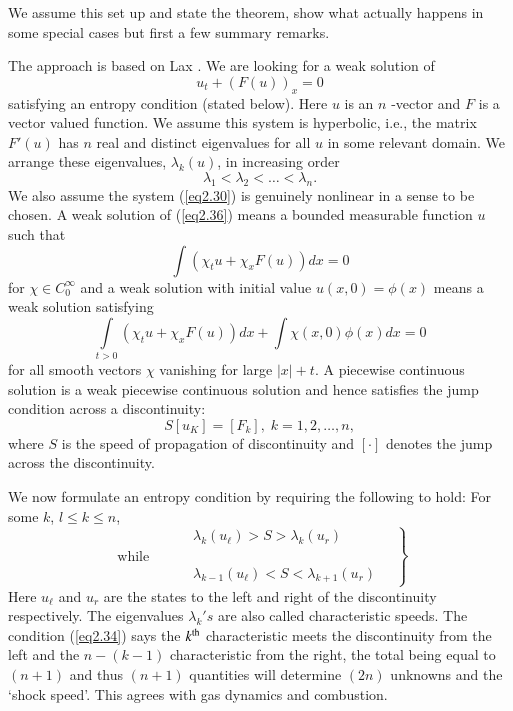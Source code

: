 We assume this set up and state the theorem, show what actually happens in some special cases but first a few summary remarks.

The approach is based on Lax \cite{key23}. We are looking for a weak solution of 
\begin{equation*}
u_t + (F(u))_x = 0 \tag{2.30}\label{eq2.30}
\end{equation*}\pageoriginale
satisfying an entropy condition (stated below). Here $u$ is an $n$ -vector and $F$ is a vector valued function. We assume this system is hyperbolic, i.e., the matrix $F'(u)$ has $n$ real and distinct eigenvalues for all $u$ in some relevant domain. We arrange these eigenvalues, $\lambda_k(u)$, in increasing order
\begin{equation*}
\lambda_1 < \lambda_2 < \ldots < \lambda_n .
\tag{2.31}\label{eq2.31}
\end{equation*}
We also assume the system (\ref{eq2.30}) is genuinely nonlinear in a sense to be chosen. A weak solution of (\ref{eq2.36}) means a bounded measurable function $u$ such that
\begin{equation*}
\int(\chi_t u + \chi_x F(u)) dx = 0\tag{2.32a}\label{eq2.32a}
\end{equation*}
for $\chi \in C^\infty_0$ and a weak solution with initial value $u(x,0) = \phi (x)$ means a weak solution satisfying
\begin{equation*}
\int\limits_{t > 0} (\chi_t u + \chi_x F(u)) dx + \int \chi (x,0) \phi (x) dx = 0
\tag{2.32b}\label{eq2.32b}
\end{equation*}
for all smooth vectors $\chi$ vanishing for large $|x| + t$. A piecewise continuous solution is a weak piecewise continuous solution and hence satisfies the jump condition across a discontinuity:
\begin{equation*}
S[u_K] = [F_k], \; k = 1,2, \ldots ,n,\tag{2.33}\label{eq2.33}
\end{equation*}
where $S$ is the speed of propagation of discontinuity and $[\cdot]$ denotes the jump across the discontinuity.

We now formulate an entropy condition by requiring the following to hold: For some $k$, $l \leq k \leq n$,
\begin{equation*}
\left. 
\begin{aligned}
& \qquad \lambda_k (u_\ell) > S > \lambda_k (u_r) \\
\text{while  }& \\
& \qquad \lambda_{k-1} (u_\ell) < S < \lambda_{k+1} (u_r) \quad 
\end{aligned}
\right\} \tag{2.34}\label{eq2.34}
\end{equation*}\pageoriginale
Here $u_\ell$ and $u_r$ are the states to the left and right of the discontinuity respectively. The eigenvalues $\lambda_k's$ are also called characteristic speeds. The condition (\ref{eq2.34}) says the $k^{\rm th}$ characteristic meets the discontinuity from the left and the $n-(k-1)$ characteristic from the right, the total being equal to $(n+1)$ and thus $(n+1)$ quantities will determine $(2n)$ unknowns and the `shock speed'. This agrees with gas dynamics and combustion.

